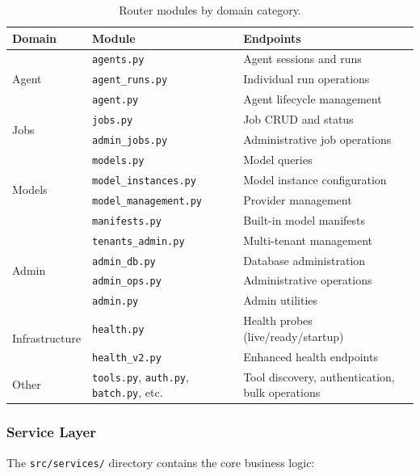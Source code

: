 \begin{table}[ht]
\centering
\caption{Router modules by domain category.}
\label{tab:router-modules}
\small
\begin{tabular}{llp{5cm}}
\hline
\textbf{Domain} & \textbf{Module} & \textbf{Endpoints} \\
\hline
\multirow{3}{*}{Agent} 
    & \texttt{agents.py} & Agent sessions and runs \\
    & \texttt{agent\_runs.py} & Individual run operations \\
    & \texttt{agent.py} & Agent lifecycle management \\
\hline
\multirow{2}{*}{Jobs}
    & \texttt{jobs.py} & Job CRUD and status \\
    & \texttt{admin\_jobs.py} & Administrative job operations \\
\hline
\multirow{4}{*}{Models}
    & \texttt{models.py} & Model queries \\
    & \texttt{model\_instances.py} & Model instance configuration \\
    & \texttt{model\_management.py} & Provider management \\
    & \texttt{manifests.py} & Built-in model manifests \\
\hline
\multirow{4}{*}{Admin}
    & \texttt{tenants\_admin.py} & Multi-tenant management \\
    & \texttt{admin\_db.py} & Database administration \\
    & \texttt{admin\_ops.py} & Administrative operations \\
    & \texttt{admin.py} & Admin utilities \\
\hline
\multirow{2}{*}{Infrastructure}
    & \texttt{health.py} & Health probes (live/ready/startup) \\
    & \texttt{health\_v2.py} & Enhanced health endpoints \\
\hline
Other & \texttt{tools.py}, \texttt{auth.py}, \texttt{batch.py}, etc. & Tool discovery, authentication, bulk operations \\
\hline
\end{tabular}
\end{table}

\subsubsection{Service Layer}

The \texttt{src/services/} directory contains the core business logic:

